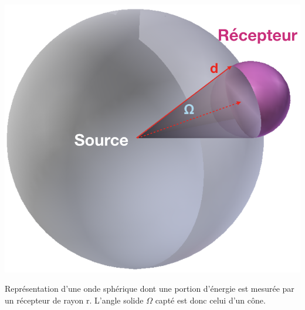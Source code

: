 \begin{figureth}
	\includegraphics[width=0.5\linewidth]{images/schema_propagation}
	\caption{Représentation d'une onde sphérique dont une portion d'énergie est mesurée par un récepteur de rayon r. L'angle solide $\Omega$ capté est donc celui d'un cône.}
	\label{schema_propagation}
\end{figureth}


